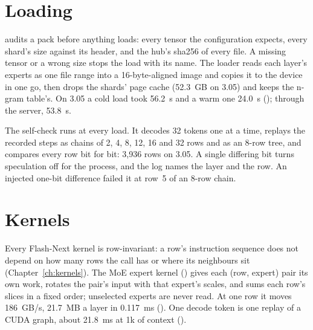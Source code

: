 \section{Loading}

 audits a pack before anything loads: every tensor the configuration expects, every shard's size against its header, and the hub's sha256 of every file. A missing tensor or a wrong size stops the load with its name. The loader reads each layer's experts as one file range into a 16-byte-aligned image and copies it to the device in one go, then drops the shards' page cache (52.3~GB on 3.05) and keeps the n-gram table's. On 3.05 a cold load took 56.2~s and a warm one 24.0~s (\measured); through the server, 53.8~s.

The self-check runs at every load. It decodes 32 tokens one at a time, replays the recorded steps as chains of 2, 4, 8, 12, 16 and 32 rows and as an 8-row tree, and compares every row bit for bit: 3,936 rows on 3.05. A single differing bit turns speculation off for the process, and the log names the layer and the row. An injected one-bit difference failed it at row~5 of an 8-row chain.

\section{Kernels}

Every Flash-Next kernel is row-invariant: a row's instruction sequence does not depend on how many rows the call has or where its neighbours sit (Chapter~\ref{ch:kernels}). The MoE expert kernel () gives each (row, expert) pair its own work, rotates the pair's input with that expert's scales, and sums each row's slices in a fixed order; unselected experts are never read. At one row it moves 186~GB/s, 21.7~MB a layer in 0.117~ms (\measured). One decode token is one replay of a CUDA graph, about 21.8~ms at 1k of context (\measured).

